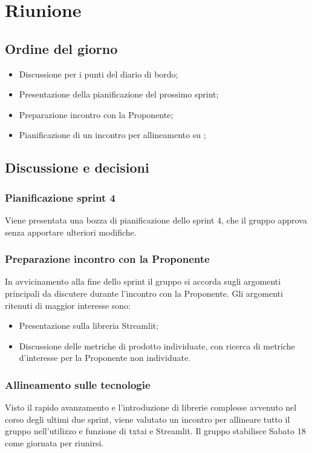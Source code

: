 \section{Riunione}
\subsection{Ordine del giorno}
\begin{itemize}
	\item Discussione per i punti del diario di bordo;
	\item Presentazione della pianificazione del prossimo sprint;
	\item Preparazione incontro con la Proponente;
	\item Pianificazione di un incontro per allineamento su ;
\end{itemize}

\subsection{Discussione e decisioni}
\subsubsection{Pianificazione sprint 4}
Viene presentata una bozza di pianificazione dello sprint 4, che il gruppo approva senza apportare ulteriori modifiche.

\subsubsection{Preparazione incontro con la Proponente}
In avvicinamento alla fine dello sprint il gruppo si accorda sugli argomenti principali da discutere durante l'incontro con la Proponente. Gli argomenti ritenuti di maggior interesse sono:
\begin{itemize}
	\item Presentazione sulla libreria Streamlit;
	\item Discussione delle metriche di prodotto individuate, con ricerca di metriche d'interesse per la Proponente non individuate.
\end{itemize}

\subsubsection{Allineamento sulle tecnologie}
Visto il rapido avanzamento e l'introduzione di librerie complesse avvenuto nel corso degli ultimi due sprint, viene valutato un incontro per allineare tutto il gruppo nell'utilizzo e funzione di txtai e Streamlit. Il gruppo stabilisce Sabato 18 come giornata per riunirsi.

